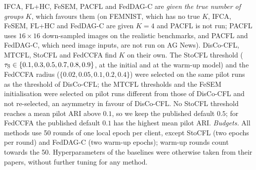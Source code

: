 IFCA, FL+HC, FeSEM, PACFL and FedDAG-C are \emph{given the true number of groups} $K$, which favours them (on FEMNIST, which has no true $K$, IFCA, FeSEM, FL+HC and FedDAG-C are given $K=4$ and PACFL is not run; PACFL uses $16\times16$ down-sampled images on the realistic benchmarks, and PACFL and FedDAG-C, which need image inputs, are not run on AG News). DisCo-CFL, MTCFL, StoCFL and FedCCFA find $K$ on their own. The StoCFL threshold ($\tau_{\rm S}\in\{0.1,0.3,0.5,0.7,0.8,0.9\}$, at the initial and at the warm-up model) and the FedCCFA radius ($\{0.02,0.05,0.1,0.2,0.4\}$) were selected on the same pilot runs as the threshold of DisCo-CFL; the MTCFL thresholds and the FeSEM initialisation were selected on pilot runs different from those of DisCo-CFL and not re-selected, an asymmetry in favour of DisCo-CFL. No StoCFL threshold reaches a mean pilot ARI above $0.1$, so we keep the published default $0.5$; for FedCCFA the published default $0.1$ has the highest mean pilot ARI. \emph{Budgets.} All methods use 50 rounds of one local epoch per client, except StoCFL (two epochs per round) and FedDAG-C (two warm-up epochs); warm-up rounds count towards the 50. Hyperparameters of the baselines were otherwise taken from their papers, without further tuning for any method.

